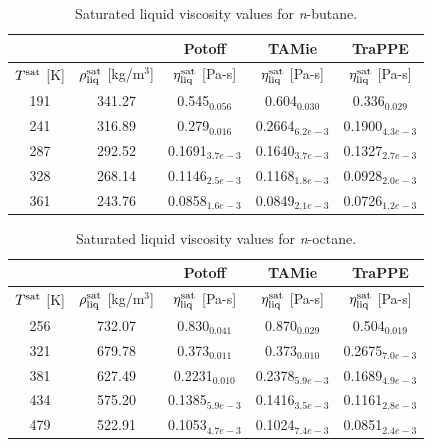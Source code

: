 \documentclass[preprint,review,12pt]{elsarticle}
\begin{document}
	\begin{table}[h!]
		\caption{Saturated liquid viscosity values for \textit{n}-butane.}
		\begin{center}
			\begin{tabular}{|c|c|c|c|c|}
				\hline
				&                                       & Potoff            & TAMie             & TraPPE            \\ \hline
				$T^{\rm sat}$ {[}K{]} & $\rho^{\rm sat}_{\rm liq}$ [kg/m$^3$] & $\eta_{\rm liq}^{\rm sat}$ {[}Pa-s{]} & $\eta_{\rm liq}^{\rm sat}$ {[}Pa-s{]} & $\eta_{\rm liq}^{\rm sat}$ {[}Pa-s{]} \\ \hline
				191 & 341.27 & 0.545$_{0.056}$   & 0.604$_{0.030}$   & 0.336$_{0.029}$   \\ \hline
				241 & 316.89 & 0.279$_{0.016}$   & 0.2664$_{6.2e-3}$ & 0.1900$_{4.3e-3}$ \\ \hline
				287 & 292.52 & 0.1691$_{3.7e-3}$ & 0.1640$_{3.7e-3}$ & 0.1327$_{2.7e-3}$ \\ \hline
				328 & 268.14 & 0.1146$_{2.5e-3}$ & 0.1168$_{1.8e-3}$ & 0.0928$_{2.0e-3}$ \\ \hline
				361 & 243.76 & 0.0858$_{1.6e-3}$ & 0.0849$_{2.1e-3}$ & 0.0726$_{1.2e-3}$ \\ \hline
			\end{tabular}
		\end{center}
	\end{table}
	
	\begin{table}[h!]
		\caption{Saturated liquid viscosity values for \textit{n}-octane.}
		\begin{center}
			\begin{tabular}{|c|c|c|c|c|}
				\hline
				&                                       & Potoff            & TAMie             & TraPPE            \\ \hline
				$T^{\rm sat}$ {[}K{]} & $\rho^{\rm sat}_{\rm liq}$ [kg/m$^3$] & $\eta_{\rm liq}^{\rm sat}$ {[}Pa-s{]} & $\eta_{\rm liq}^{\rm sat}$ {[}Pa-s{]} & $\eta_{\rm liq}^{\rm sat}$ {[}Pa-s{]} \\ \hline
				256 & 732.07 & 0.830$_{0.041}$   & 0.870$_{0.029}$   & 0.504$_{0.019}$   \\ \hline
				321 & 679.78 & 0.373$_{0.011}$   & 0.373$_{0.010}$   & 0.2675$_{7.0e-3}$ \\ \hline
				381 & 627.49 & 0.2231$_{0.010}$  & 0.2378$_{5.9e-3}$ & 0.1689$_{4.9e-3}$ \\ \hline
				434 & 575.20 & 0.1385$_{5.9e-3}$ & 0.1416$_{3.5e-3}$ & 0.1161$_{2.8e-3}$ \\ \hline
				479 & 522.91 & 0.1053$_{4.7e-3}$ & 0.1024$_{7.4e-3}$ & 0.0851$_{2.4e-3}$ \\ \hline
			\end{tabular}
		\end{center}
	\end{table}
	
\end{document}
